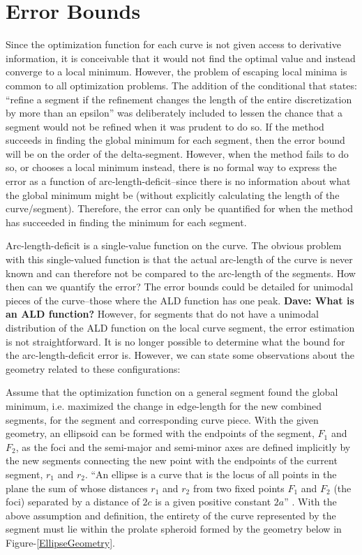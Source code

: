 \section{Error Bounds}
Since the optimization function for each curve is not given access to 
derivative information, it is conceivable that it would not find the 
optimal value and instead converge to a local minimum.  However, the 
problem of escaping local minima is common to all optimization problems.  
The addition of the conditional that states: ``refine a segment if the 
refinement changes the length of the entire discretization by more than an 
epsilon'' was deliberately included to lessen the chance that a segment 
would not be refined when it was prudent to do so.  If the method succeeds 
in finding the global minimum for each segment, then the error bound will 
be on the order of the delta-segment.  However, when the method fails to 
do so, or chooses a local minimum instead, there is no formal way to 
express the error as a function of arc-length-deficit--since there is no 
information about what the global minimum might be (without explicitly 
calculating the length of the curve/segment).  Therefore, the error can 
only be quantified for when the method has succeeded in finding the 
minimum for each segment.

        Arc-length-deficit is a single-value function on the curve.  The 
obvious problem with this single-valued function is that the actual 
arc-length of the curve is never known and can therefore not be compared 
to the arc-length of the segments.  How then can we quantify the error?  
The error bounds could be detailed for unimodal pieces of the curve--those 
where the ALD function has one peak.  {\bf{Dave:  What is an ALD 
function?}} However, for segments that do 
not have a unimodal distribution of the ALD function on the local curve segment, the error estimation is not straightforward.  It is no longer possible to determine what the bound for the arc-length-deficit error is.  However, we can state some observations about the geometry related to these configurations:

Assume that the optimization function on a general segment found the global minimum, i.e. maximized the change in edge-length for the new combined segments, for the segment and corresponding curve piece.  With the given geometry, an ellipsoid can be formed with the endpoints of the segment, $F_1$ and $F_2$, as the foci and the semi-major and semi-minor axes are defined implicitly by the new segments connecting the new point with the endpoints of the current segment, $r_1$ and $r_2$.  ``An ellipse is a curve that is the locus of all points in the plane the sum of whose distances $r_1$ and $r_2$ from two fixed points $F_1$ and $F_2$ (the foci) separated by a distance of $2c$ is a given positive constant $2a$'' \cite{weissteine}.  With the above assumption and definition, the entirety of the curve represented by the segment must lie within the prolate spheroid  formed by the geometry below in Figure-\ref{EllipseGeometry}.

